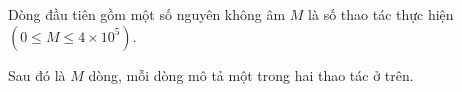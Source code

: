 Dòng đầu tiên gồm một số nguyên không âm $M$ là số thao tác thực hiện $(0\le M\le 4\times 10^5)$.

Sau đó là $M$ dòng, mỗi dòng mô tả một trong hai thao tác ở trên.